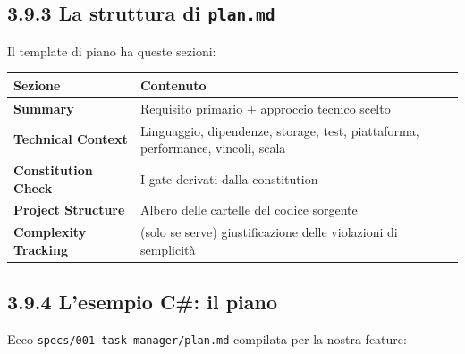 \documentclass[
  italian,
  10pt,
]{book}
\newcounter{none} %
\begin{document}
\subsection{\texorpdfstring{3.9.3 La struttura di
\texttt{plan.md}}{3.9.3 La struttura di plan.md}}\label{la-struttura-di-plan.md}

Il template di piano ha queste sezioni:

{\def\LTcaptype{none} %
\begin{longtable}[]{@{}
  >{\raggedright\arraybackslash}p{}
  >{\raggedright\arraybackslash}p{}@{}}
\toprule\noalign{}
\begin{minipage}[b]{\linewidth}\raggedright
Sezione
\end{minipage} & \begin{minipage}[b]{\linewidth}\raggedright
Contenuto
\end{minipage} \\
\midrule\noalign{}
\endhead
\bottomrule\noalign{}
\endlastfoot
\textbf{Summary} & Requisito primario + approccio tecnico scelto \\
\textbf{Technical Context} & Linguaggio, dipendenze, storage, test,
piattaforma, performance, vincoli, scala \\
\textbf{Constitution Check} & I gate derivati dalla constitution \\
\textbf{Project Structure} & Albero delle cartelle del codice
sorgente \\
\textbf{Complexity Tracking} & (solo se serve) giustificazione delle
violazioni di semplicità \\
\end{longtable}
}

\subsection{3.9.4 L'esempio C\#: il piano}\label{lesempio-c-il-piano}

Ecco \texttt{specs/001-task-manager/plan.md} compilata per la nostra
feature:
\end{document}
